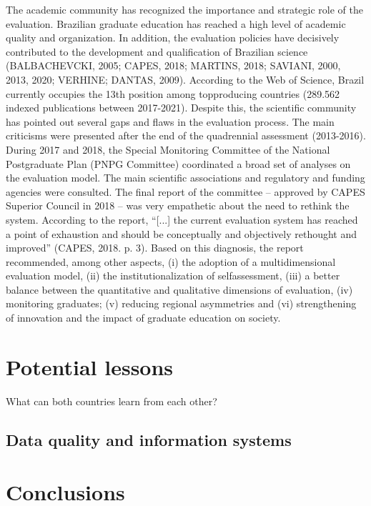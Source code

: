 The academic community has recognized the importance and strategic role of the evaluation. Brazilian graduate education has reached a high level of academic quality and organization. In addition, the evaluation policies have decisively contributed to the development and qualification of Brazilian science (BALBACHEVCKI, 2005; CAPES, 2018; MARTINS, 2018; SAVIANI, 2000, 2013, 2020; VERHINE; 
DANTAS, 2009). According to the Web of Science, 
Brazil currently occupies the 13th position among topproducing countries (289.562 indexed publications between 2017-2021). Despite this, the scientific community has pointed out several gaps and flaws in the evaluation process. The main criticisms were presented after the end of the quadrennial assessment (2013-2016). During 2017 and 2018, the Special Monitoring Committee of the National Postgraduate Plan (PNPG Committee) coordinated a broad set of analyses on the evaluation model. The main scientific associations and regulatory and funding agencies were consulted.  The final report of the committee – approved by CAPES Superior Council in 2018 – was very empathetic about the need to rethink the system. According to the report, “[...] the current evaluation system has reached a point of exhaustion and should be conceptually and objectively rethought and improved” (CAPES, 2018. p. 3). Based on this diagnosis, the report recommended, among other aspects, (i) the adoption of a multidimensional evaluation model, (ii)  the institutionalization of selfassessment, (iii) a better balance between the quantitative and qualitative dimensions of evaluation, (iv) monitoring graduates; (v) reducing regional asymmetries and (vi) strengthening of innovation and the impact of graduate education on society. 


\section{Potential lessons}
\label{sec:comp_evaluation:discussion}

What can both countries learn from each other?

\subsection{Data quality and information systems}
\label{subsec:comp_evaluation:cris}



\section{Conclusions}
\label{sec:comp_evaluation:conclusions}

